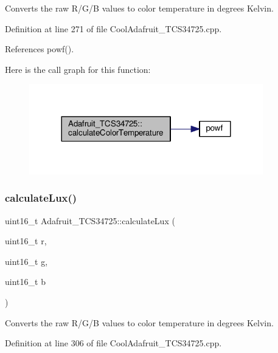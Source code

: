 Converts the raw R/\+G/B values to color temperature in degrees Kelvin. 



Definition at line 271 of file Cool\+Adafruit\+\_\+\+T\+C\+S34725.\+cpp.



References powf().

Here is the call graph for this function\+:
\nopagebreak
\begin{figure}[H]
\begin{center}
\leavevmode
\includegraphics[width=288pt]{df/d54/class_adafruit___t_c_s34725_a9c6c7ab8a84a47a65ff04a125bcfee92_cgraph}
\end{center}
\end{figure}
\mbox{\label{class_adafruit___t_c_s34725_a10b9be546ee3bdf04e0380161aad589b}} 
\subsubsection{\texorpdfstring{calculate\+Lux()}{calculateLux()}}
{\footnotesize\ttfamily uint16\+\_\+t Adafruit\+\_\+\+T\+C\+S34725\+::calculate\+Lux (\begin{DoxyParamCaption}\item[{uint16\+\_\+t}]{r,  }\item[{uint16\+\_\+t}]{g,  }\item[{uint16\+\_\+t}]{b }\end{DoxyParamCaption})}



Converts the raw R/\+G/B values to color temperature in degrees Kelvin. 



Definition at line 306 of file Cool\+Adafruit\+\_\+\+T\+C\+S34725.\+cpp.

\mbox{\label{class_adafruit___t_c_s34725_aa526557ad0d76b3b6e31e6197de583e6}} 
